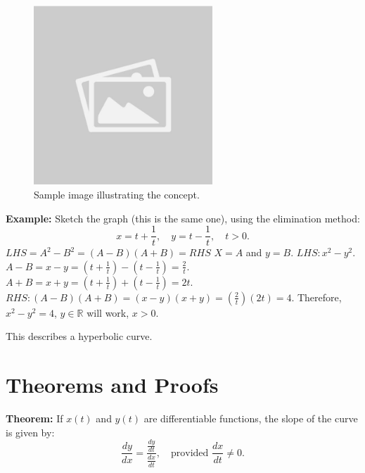 \documentclass{article}
\begin{document}
\begin{figure}[H]
    \centering
    \includegraphics[width=0.6\textwidth]{sample_image.jpg}
    \caption{Sample image illustrating the concept.}
    \label{fig:sample_image}
\end{figure}

\begin{examplebox}
\textbf{Example:} Sketch the graph (this is the same one), using the elimination method:
\[ x = t + \frac{1}{t}, \quad y = t - \frac{1}{t}, \quad t > 0. \]
\( LHS = A^2 - B^2 = (A - B)(A + B) = RHS \)
\( X = A \) and \( y = B \).
\( LHS: x^2 - y^2 \).
\( A - B = x - y = (t + \frac{1}{t}) - (t - \frac{1}{t}) = \frac{2}{t} \).
\( A + B = x + y = (t + \frac{1}{t}) + (t - \frac{1}{t}) = 2t \).
\( RHS: (A - B)(A + B) = (x - y)(x + y) = (\frac{2}{t})(2t) = 4 \).
Therefore, \( x^2 - y^2 = 4 \), \( y \in \mathbb{R} \) will work, \( x > 0 \).

This describes a hyperbolic curve.
\end{examplebox}

\section*{Theorems and Proofs}
\begin{theorembox}
\textbf{Theorem:} If $x(t)$ and $y(t)$ are differentiable functions, the slope of the curve is given by:
\[ \frac{dy}{dx} = \frac{\frac{dy}{dt}}{\frac{dx}{dt}}, \quad \text{provided } \frac{dx}{dt} \neq 0. \]
\end{theorembox}
\end{document}
